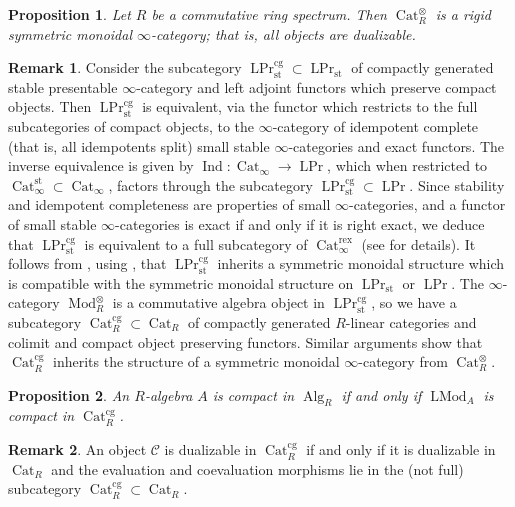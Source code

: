 \documentclass{article}
\newtheorem{proposition}{Proposition}[subsection]
\theoremstyle{definition}
\newtheorem{remark}{Remark}[subsection]
\newcommand{\C}{\mathcal{C}}
\renewcommand{\i}{\infty}
\DeclareMathOperator{\LMod}{LMod}
\DeclareMathOperator{\Mod}{Mod}
\DeclareMathOperator{\Alg}{Alg}
\DeclareMathOperator{\Cat}{Cat}
\DeclareMathOperator{\Prl}{LPr}
\newcommand{\st}{\mathrm{st}}
\DeclareMathOperator{\Ind}{Ind}
\begin{document}
\begin{proposition}
Let $R$ be a commutative ring spectrum.
Then $\Cat_R^\otimes$ is a rigid symmetric monoidal $\i$-category; that is, all objects are dualizable.
\end{proposition}

\begin{remark}
Consider the subcategory
$
\Prl_{\st}^{\mathrm{cg}}\subset\Prl_{\st}
$
of compactly generated stable presentable $\infty$-category and left adjoint functors which preserve compact objects. Then $\Prl_{\st}^{\mathrm{cg}}$ is equivalent, via the functor which restricts to the full subcategories of compact objects, to the $\i$-category of idempotent complete (that is, all idempotents split) small stable $\i$-categories and exact functors.
The inverse equivalence is given by $\Ind:\Cat_\i\to\Prl$, which when restricted to $\Cat_\i^{\st}\subset\Cat_\i$, factors through the subcategory $\Prl_{\st}^{\mathrm{cg}}\subset\Prl$.
Since stability and idempotent completeness are properties of small $\i$-categories, and a functor of small stable $\i$-categories is exact if and only if it is right exact, we deduce that $\Prl_{\st}^\mathrm{cg}$ is equivalent to a full subcategory of $\Cat_\i^\mathrm{rex}$ (see \cite[Proposition 5.5.7.8]{HTT} for details).
It follows from \cite[Proposition 4.8.1.4]{HA}, using \cite[Remark 2.2.1.2]{HA}, that $\Prl_{\st}^\mathrm{cg}$ inherits a symmetric monoidal structure which is compatible with the symmetric monoidal structure on $\Prl_{\st}$ or $\Prl$.
The $\infty$-category $\Mod_R^\otimes$ is a commutative algebra object in
$\Prl_{\st}^{\mathrm{cg}}$, so we have a subcategory $\Cat_{R}^{\mathrm{cg}}\subset\Cat_R$ of compactly
generated $R$-linear categories and colimit and compact object preserving functors.
Similar arguments show that $\Cat_{R}^{\mathrm{cg}}$ inherits the structure of a symmetric monoidal $\i$-category from $\Cat_R^\otimes$.
\end{remark}

\begin{proposition}{\em \cite[Proposition 3.5]{AG14}}\label{prop:Acpt}
An $R$-algebra $A$ is compact in $\Alg_R$ if and only if $\LMod_A$ is compact in $\Cat_{R}^{\mathrm{cg}}$.
\end{proposition}

\begin{remark}
An object $\C$ is dualizable in $\Cat_{R}^{\mathrm{cg}}$ if and only if it is dualizable in $\Cat_R$ and the evaluation and coevaluation morphisms lie in the (not full) subcategory $\Cat_{R}^{\mathrm{cg}}\subset\Cat_R$.
\end{remark}
\end{document}
